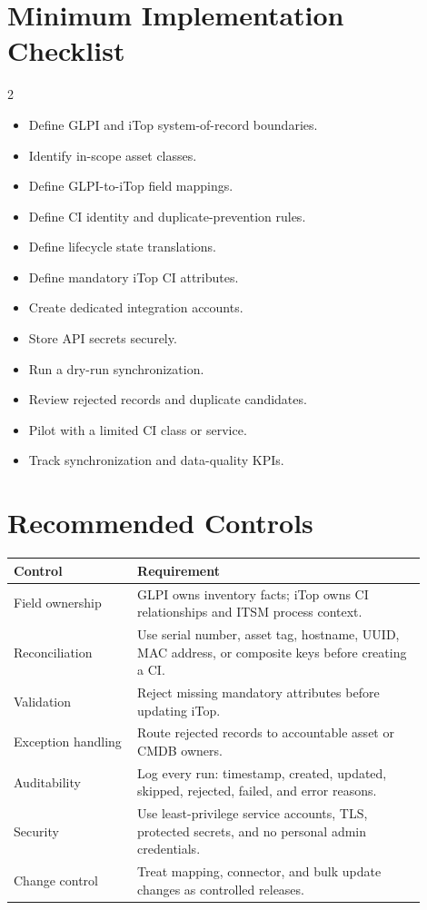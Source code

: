 \documentclass[11pt]{article}
\newcommand{\checkbox}{\fbox{\rule{0pt}{1.1ex}\rule{1.1ex}{0pt}}}
\begin{document}
\section{Minimum Implementation Checklist}

\begin{multicols}{2}
\begin{itemize}
  \item[\checkbox] Define GLPI and iTop system-of-record boundaries.
  \item[\checkbox] Identify in-scope asset classes.
  \item[\checkbox] Define GLPI-to-iTop field mappings.
  \item[\checkbox] Define CI identity and duplicate-prevention rules.
  \item[\checkbox] Define lifecycle state translations.
  \item[\checkbox] Define mandatory iTop CI attributes.
  \item[\checkbox] Create dedicated integration accounts.
  \item[\checkbox] Store API secrets securely.
  \item[\checkbox] Run a dry-run synchronization.
  \item[\checkbox] Review rejected records and duplicate candidates.
  \item[\checkbox] Pilot with a limited CI class or service.
  \item[\checkbox] Track synchronization and data-quality KPIs.
\end{itemize}
\end{multicols}

\section{Recommended Controls}

\begin{longtable}{p{0.27\linewidth}p{0.63\linewidth}}
\toprule
\rowcolor{LightBlue}\textbf{Control} & \textbf{Requirement} \\
\midrule
Field ownership & GLPI owns inventory facts; iTop owns CI relationships and ITSM process context. \\
Reconciliation & Use serial number, asset tag, hostname, UUID, MAC address, or composite keys before creating a CI. \\
Validation & Reject missing mandatory attributes before updating iTop. \\
Exception handling & Route rejected records to accountable asset or CMDB owners. \\
Auditability & Log every run: timestamp, created, updated, skipped, rejected, failed, and error reasons. \\
Security & Use least-privilege service accounts, TLS, protected secrets, and no personal admin credentials. \\
Change control & Treat mapping, connector, and bulk update changes as controlled releases. \\
\bottomrule
\end{longtable}
\end{document}
